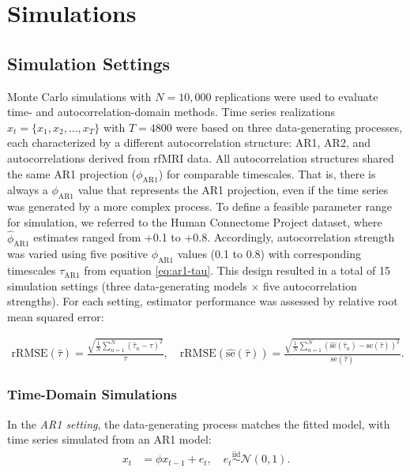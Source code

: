 \documentclass[docs/main.tex]{subfiles}
\begin{document}
\section{Simulations}\label{sec:simulations}

\subsection{Simulation Settings}
Monte Carlo simulations with $N = 10,000$ replications were used to evaluate time- and autocorrelation-domain methods. Time series realizations $x_t = \{x_1, x_2, ..., x_T\}$ with $T=4800$ were based on three data-generating processes, each characterized by a different autocorrelation structure: AR1, AR2, and autocorrelations derived from rfMRI data. All autocorrelation structures shared the same AR1 projection ($\phi_\text{AR1}$) for comparable timescales. That is, there is always a $\phi_\text{AR1}$ value that represents the AR1 projection, even if the time series was generated by a more complex process. To define a feasible parameter range for simulation, we referred to the Human Connectome Project dataset, where $\hat\phi_\text{AR1}$ estimates ranged from +0.1 to +0.8. Accordingly, autocorrelation strength was varied using five positive $\phi_\text{AR1}$ values (0.1 to 0.8) with corresponding timescales $\tau_\text{AR1}$ from equation \eqref{eq:ar1-tau}. This design resulted in a total of 15 simulation settings (three data-generating models $\times$ five autocorrelation strengths). For each setting, estimator performance was assessed by relative root mean squared error:

\begin{align}
    \text{rRMSE}(\hat\tau) = \frac{\sqrt{\frac{1}{N} \sum_{n=1}^N (\hat\tau_n - \tau)^2}}{\tau}, \quad \text{rRMSE}(\widehat{\text{se}}(\hat\tau)) = \frac{\sqrt{\frac{1}{N} \sum_{n=1}^N \left(\widehat{\text{se}}(\hat\tau_n) - \text{se}(\hat\tau)\right)^2}}{\text{se}(\hat\tau)}.
\end{align}

\subsubsection{Time-Domain Simulations}
In the \textit{AR1 setting}, the data-generating process matches the fitted model, with time series simulated from an AR1 model:
\begin{align}
    x_t &= \phi x_{t-1} + e_t, \quad e_t \overset{\text{iid}}{\sim} \mathcal{N}(0, 1).
\end{align}
\end{document}
